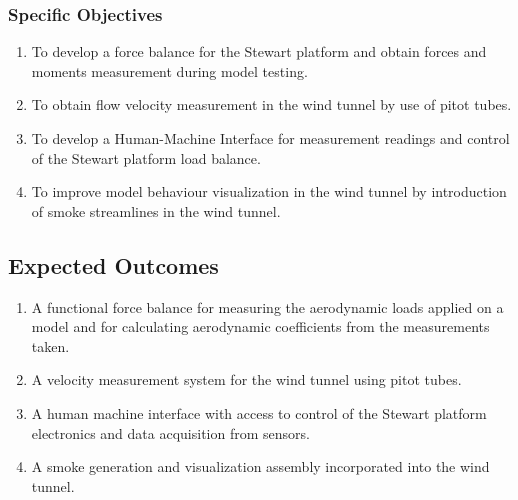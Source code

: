 \subsubsection{Specific Objectives}
\begin{enumerate}
\item To develop a force balance for the Stewart platform and obtain forces and moments measurement during model testing.
\item To obtain flow velocity measurement in the wind tunnel by use of pitot tubes.
\item To develop a Human-Machine Interface for measurement readings and control of the Stewart platform load balance.
\item To improve model behaviour visualization in the wind tunnel by introduction of smoke streamlines in the wind tunnel.
\end{enumerate}
\subsection{Expected Outcomes}
\begin{enumerate}
\item A functional force balance for measuring the aerodynamic loads applied on a model
and for calculating aerodynamic coefficients from the measurements taken.
\item A velocity measurement system for the wind tunnel using pitot tubes.
\item A human machine interface with access to control of the Stewart platform electronics
and data acquisition from sensors.
\item A smoke generation and visualization assembly incorporated into the wind tunnel. 
\end{enumerate}
